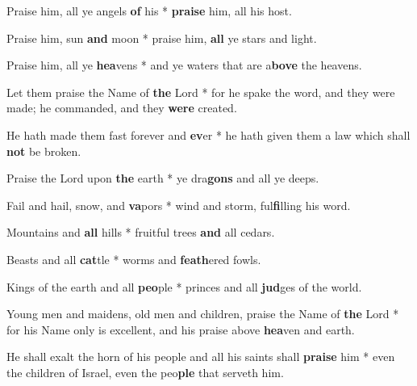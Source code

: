 \begin{multicols}{2}
	Praise him, all ye angels \textbf{of} his * \textbf{praise} him, all his host.
	
	Praise him, sun \textbf{and} moon * praise him, \textbf{all} ye stars and light.
	
	Praise him, all ye \textbf{hea}vens * and ye waters that are a\textbf{bove} the heavens.
	
	Let them praise the Name of \textbf{the} Lord * for he spake the word, and they were made; he commanded, and they \textbf{were} created.
	
	He hath made them fast forever and \textbf{ev}er * he hath given them a law which shall \textbf{not} be broken.
	
	Praise the Lord upon \textbf{the} earth * ye dra\textbf{gons} and all ye deeps.
	
	Fail and hail, snow, and \textbf{va}pors * wind and storm, ful\textbf{fi}lling his word.
	
	Mountains and \textbf{all} hills * fruitful trees \textbf{and} all cedars.
	
	Beasts and all \textbf{cat}tle * worms and \textbf{feath}ered fowls.
	
	Kings of the earth and all \textbf{peo}ple * princes and all \textbf{jud}ges of the world.
	
	Young men and maidens, old men and children, praise the Name of \textbf{the} Lord * for his Name only is excellent, and his praise above \textbf{hea}ven and earth.
	
	He shall exalt the horn of his people and all his saints shall \textbf{praise} him * even the children of Israel, even the peo\textbf{ple} that serveth him.
\end{multicols}